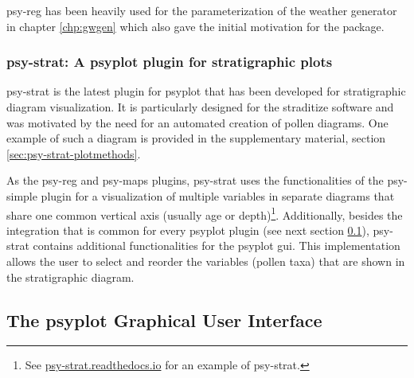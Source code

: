 \begin{refsection}
psy-reg has been heavily used for the parameterization of the weather generator in chapter \ref{chp:gwgen} which also gave the initial motivation for the package. 

\subsubsection{psy-strat: A psyplot plugin for stratigraphic plots}

psy-strat is the latest plugin for psyplot that has been developed for stratigraphic diagram visualization. It is particularly designed for the straditize software \citep[chapter \ref{chp:straditize}]{SommerRechChevalierEtAl2019} and was motivated by the need for an automated creation of pollen diagrams. One example of such a diagram is provided in the supplementary material, section \ref{sec:psy-strat-plotmethods}.

As the psy-reg and psy-maps plugins, psy-strat uses the functionalities of the psy-simple plugin for a visualization of multiple variables in separate diagrams that share one common vertical axis (usually age or depth)\footnote{See \href{https://psy-strat.readthedocs.io}{psy-strat.readthedocs.io} for an example of psy-strat.}. Additionally, besides the integration that is common for every psyplot plugin (see next section \ref{sec:psyplot-gui}), psy-strat contains additional functionalities for the psyplot \gls{gui}. This implementation allows the user to select and reorder the variables (pollen taxa) that are shown in the stratigraphic diagram.


\subsection{The psyplot Graphical User Interface}  \label{sec:psyplot-gui}


\end{refsection}
